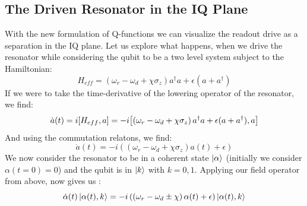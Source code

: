 

\subsection{The Driven Resonator in the IQ Plane}\label{sec:driving_resonator_iq_plane}
With the new formulation of Q-functions we can visualize the readout drive as a separation in the IQ plane. Let us explore what happens, when we drive the resonator while considering the qubit to be a two level system subject to the Hamiltonian:
\begin{equation}
    H_{eff} =  \left(\omega_r - \omega_d + \chi \sigma_z\right)a^\dagger a + \epsilon(a + a^\dagger)
\end{equation}
If we were to take the time-derivative of the lowering operator of the resonator, we find:
\begin{equation}
    \dot{a}(t) = i\comm{H_{eff}}{a} = -i\comm{\left(\omega_r - \omega_d + \chi \sigma_z\right)a^\dagger a + \epsilon(a + a^\dagger)}{a}
\end{equation}
And using the commutation relatons, we find:
\begin{equation}
    \dot{a}(t) = -i \left(\left(\omega_r - \omega_d + \chi \sigma_z\right) a(t) + \epsilon\right)
\end{equation}
We now consider the resonator to be in a coherent state $\ket{\alpha}$ (initially we consider $\alpha(t=0) = 0$) and the qubit is in $\ket{k}$ with $k = 0,  1$. Applying our field operator from above, now gives us \cite{blais_circuit_2021}:
\begin{equation}
    \dot{\alpha}(t) \ket{\alpha(t), k} = - i \left(\left(\omega_r - \omega_d \pm \chi \right) \alpha(t) + \epsilon\right) \ket{\alpha(t), k} 
\end{equation}


